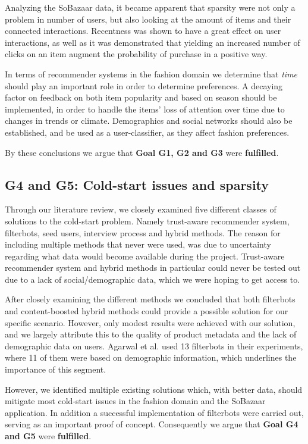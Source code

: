 Analyzing the SoBazaar data, it became apparent that sparsity were not only a
problem in number of users, but also looking at the amount of items and their
connected interactions. Recentness was shown to have a great effect on user
interactions, as well as it was demonstrated that yielding an increased number
of clicks on an item augment the probability of purchase in a positive way.

In terms of recommender systems in the fashion domain we determine that
\textit{time} should play an important role in order to determine preferences.
A decaying factor on feedback on both item popularity and based on season
should be implemented, in order to handle the items' loss of attention over
time due to changes in trends or climate. Demographics and social networks
should also be established, and be used as a user-classifier, as they affect
fashion preferences.

By these conclusions we argue that \textbf{Goal G1, G2 and G3} were
\textbf{fulfilled}.

\subsection{G4 and G5: Cold-start issues and sparsity}
\label{sec:cold-start-conclusion-discussion}

Through our literature review, we closely examined five different classes of
solutions to the cold-start problem. Namely trust-aware recommender system,
filterbots, seed users, interview process and hybrid methods. The reason for
including multiple methods that never were used, was due to uncertainty
regarding what data would become available during the project. Trust-aware
recommender system and hybrid methods in particular could never be tested out
due to a lack of social/demographic data, which we were hoping to get access
to.

After closely examining the different methods we concluded that both filterbots
and content-boosted hybrid methods could provide a possible solution for our
specific scenario. However, only modest results were achieved with our
solution, and we largely attribute this to the quality of product metadata and
the lack of demographic data on users. Agarwal et al. \cite{Agarwal2009} used
13 filterbots in their experiments, where 11 of them were based on demographic
information, which underlines the importance of this segment.

However, we identified multiple existing solutions which, with better data,
should mitigate most cold-start issues in the fashion domain and the SoBazaar
application. In addition a successful implementation of filterbots were carried
out, serving as an important proof of concept. Consequently we argue that
\textbf{Goal G4 and G5} were \textbf{fulfilled}.

